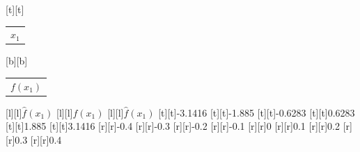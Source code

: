 %    
%
%
\begin{psfrags}%
\psfragscanon%
%
[t][t]{\setlength{\tabcolsep}{0pt}\begin{tabular}{c}$x_1$\end{tabular}}%
[b][b]{\setlength{\tabcolsep}{0pt}\begin{tabular}{c}$f(x_1)$\end{tabular}}%
[l][l]{$\hat f(x_1)$}%
[l][l]{$f(x_1)$}%
[l][l]{$\hat f(x_1)$}%
%
[t][t]{-3.1416}%
[t][t]{-1.885}%
[t][t]{-0.6283}%
[t][t]{0.6283}%
[t][t]{1.885}%
[t][t]{3.1416}%
%
[r][r]{-0.4}%
[r][r]{-0.3}%
[r][r]{-0.2}%
[r][r]{-0.1}%
[r][r]{0}%
[r][r]{0.1}%
[r][r]{0.2}%
[r][r]{0.3}%
[r][r]{0.4}%
%
%
\end{psfrags}%
%
